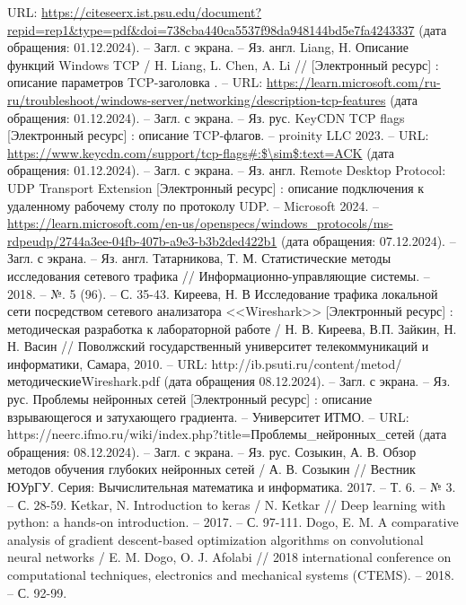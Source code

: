 \documentclass[spec, och, diploma]{SCWorks}
\begin{document}
\begin{thebibliography}{25}
    URL: \url{https://citeseerx.ist.psu.edu/document?repid=rep1&type=pdf&doi=738cba440ca5537f98da948144bd5e7fa4243337} (дата обращения: 01.12.2024). -- Загл. с экрана. -- Яз. англ.
    Liang, H. Описание функций Windows TCP /  H. Liang, L. Chen, A. Li // [Электронный ресурс] : описание параметров TCP-заголовка . -- URL: 
    \url{https://learn.microsoft.com/ru-ru/troubleshoot/windows-server/networking/description-tcp-features} (дата обращения: 01.12.2024). -- Загл. с экрана. --  Яз. рус.
    KeyCDN TCP flags [Электронный ресурс] : описание TCP-флагов. -- proinity LLC 2023. -- URL: \url{https://www.keycdn.com/support/tcp-flags\#:$\sim$:text=ACK}
    (дата обращения: 01.12.2024). -- Загл. с экрана. --  Яз. англ.
    Remote Desktop Protocol: UDP Transport Extension [Электронный ресурс] : описание подключения к удаленному рабочему столу по протоколу UDP. -- Microsoft 2024. -- 
    \url{https://learn.microsoft.com/en-us/openspecs/windows_protocols/ms-rdpeudp/2744a3ee-04fb-407b-a9e3-b3b2ded422b1} (дата обращения: 07.12.2024). -- Загл. с экрана. --  Яз. англ.
    Татарникова, Т. М. Статистические методы исследования сетевого трафика // Информационно-управляющие системы. -- 2018. -- №. 5 (96). -- С. 35-43.
    Киреева, Н. В Исследование трафика локальной сети посредством сетевого анализатора <<Wireshark>> [Электронный ресурс] : методическая разработка к лабораторной работе / Н. В. Киреева, В.П. Зайкин, Н. Н. Васин // Поволжский государственный университет телекоммуникаций и информатики, Самара, 2010. -- URL: http://ib.psuti.ru/content/metod/методическиеWireshark.pdf (дата обращения 08.12.2024). -- Загл. с экрана. -- Яз. рус.
    Проблемы нейронных сетей [Электронный ресурс] : описание взрывающегося и затухающего градиента. -- Университет ИТМО. -- URL: https://neerc.ifmo.ru/wiki/index.php?title=Проблемы_нейронных_сетей (дата обращения: 08.12.2024). -- Загл. с экрана. --  Яз. рус.
    Созыкин, А. В. Обзор методов обучения глубоких нейронных сетей / А. В. Созыкин // Вестник ЮУрГУ. Серия: Вычислительная математика и информатика. 2017. -- Т. 6. -- № 3. -- С. 28-59.
    Ketkar, N. Introduction to keras / N. Ketkar // Deep learning with python: a hands-on introduction. -- 2017. -- С. 97-111.
    Dogo, E. M. A comparative analysis of gradient descent-based optimization algorithms on convolutional neural networks / E. M. Dogo, O. J. Afolabi // 
    2018 international conference on computational techniques, electronics and mechanical systems (CTEMS). -- 2018. -- С. 92-99.

\end{thebibliography}
\end{document}
